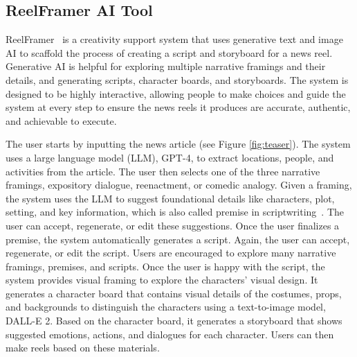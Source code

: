 \subsection{ReelFramer AI Tool}

ReelFramer~\cite{reelframer} is a creativity support system that uses generative text and image AI to scaffold the process of creating a script and storyboard for a news reel. 
Generative AI is helpful for exploring multiple narrative framings and their details, and generating scripts, character boards, and storyboards. 
The system is designed to be highly interactive, allowing people to make choices and guide the system at every step to ensure the news reels it produces are accurate, authentic, and achievable to execute.

The user starts by inputting the news article (see Figure \ref{fig:teaser}). 
The system uses a large language model (LLM), GPT-4, to extract locations, people, and activities from the article. 
The user then selects one of the three narrative framings, expository dialogue, reenactment, or comedic analogy. 
Given a framing, the system uses the LLM to suggest foundational details like characters, plot, setting, and key information, which is also called premise in scriptwriting~\cite{batty2017script}.
The user can accept, regenerate, or edit these suggestions.
Once the user finalizes a premise, the system automatically generates a script. 
Again, the user can accept, regenerate, or edit the script.
Users are encouraged to explore many narrative framings, premises, and scripts. 
Once the user is happy with the script, the system provides visual framing to explore the characters’ visual design.
It generates a character board that contains visual details of the costumes, props, and backgrounds to distinguish the characters using a text-to-image model, DALL-E 2. 
Based on the character board, it generates a storyboard that shows suggested emotions, actions, and dialogues for each character. 
Users can then make reels based on these materials.
